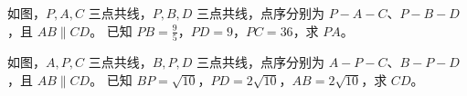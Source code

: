 \documentclass{exam-zh}
\begin{document}

\begin{problem}[points=10]
  \noindent
  \begin{minipage}[t]{\dimexpr\linewidth-60mm-6mm\relax}
    \vspace{0pt}
    如图，$P,A,C$ 三点共线，$P,B,D$ 三点共线，点序分别为 $P-A-C$、$P-B-D$，且 $AB\parallel CD$。
已知 $PB=\frac{9}{5}$，$PD=9$，$PC=36$，求 $PA$。
    
  \end{minipage}\hfill
  \begin{diagramcoltikz}{60mm}{先看平行边方向，再判断 A 字型或 8 字型及对应边。}
  }
  \end{diagramcoltikz}
  \par\medskip
  \answerarea[42mm]
\end{problem}



\begin{problem}[points=10]
  \noindent
  \begin{minipage}[t]{\dimexpr\linewidth-60mm-6mm\relax}
    \vspace{0pt}
    如图，$A,P,C$ 三点共线，$B,P,D$ 三点共线，点序分别为 $A-P-C$、$B-P-D$，且 $AB\parallel CD$。
已知 $BP=\sqrt{10}$，$PD=2\sqrt{10}$，$AB=2\sqrt{10}$，求 $CD$。
    
  \end{minipage}\hfill
  \begin{diagramcoltikz}{60mm}{先看平行边方向，再判断 A 字型或 8 字型及对应边。}
  }
  \end{diagramcoltikz}
  \par\medskip
  \answerarea[42mm]
\end{problem}
\end{document}
